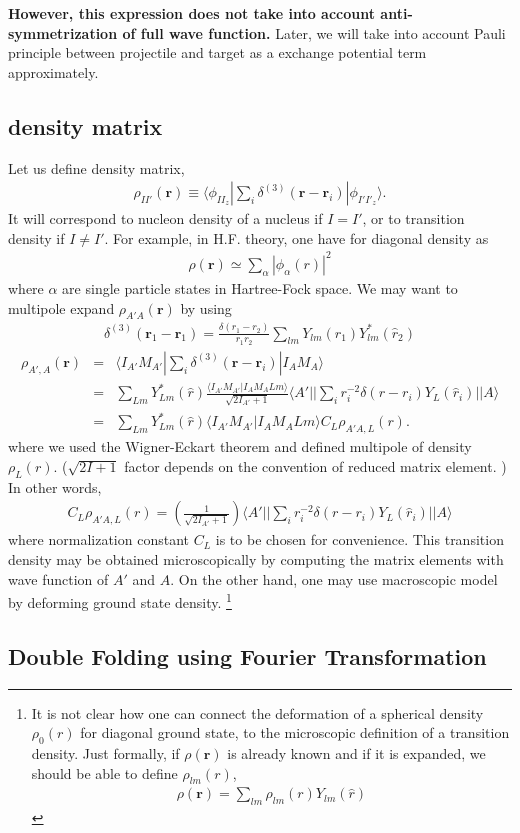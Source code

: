 \documentclass[11pt]{book}
\def\bm{\boldsymbol}
\def\vr{{\bm r}}
\def\la{\langle}
\def\ra{\rangle}
\newcommand{\bea}{\begin{eqnarray}}
\newcommand{\eea}{\end{eqnarray}}
\newcommand{\no}{\nonumber \\}
\begin{document}
{\bf However, this expression does not take into account anti-symmetrization of full wave function.}
Later, we will take into account Pauli principle between projectile and target 
as a exchange potential term approximately. 

\subsection{density matrix} 
Let us define density matrix, 
\bea 
\rho_{I I'}(\vr) \equiv \la \phi_{I I_z}|\sum_{i}  \delta^{(3)}(\vr-\vr_i) |\phi_{I' I'_z}\ra.
\eea 
It will correspond to nucleon density of a nucleus if $I=I'$, or  
to transition density if $I\neq I'$.
For example, in H.F. theory, one have for diagonal density as
\bea
\rho(\vr)\simeq \sum_\alpha |\phi_\alpha(r)|^2 
\eea 
where $\alpha$ are single particle states in Hartree-Fock space.
We may want to multipole expand $\rho_{A'A}(\vr)$ by using  
\bea 
\delta^{(3)}(\vr_1-\vr_1)=\frac{\delta(r_1-r_2)}{r_1r_2}\sum_{lm} Y_{lm}(\hat{r}_1)Y^*_{lm}(\hat{r}_2)
\eea 
\bea 
\rho_{A',A}(\vr) &=& \la I_{A'} M_{A'}| \sum_i \delta^{(3)}(\vr-\vr_i)| I_A M_A\ra \no 
    &=& \sum_{L m}  Y^*_{Lm}(\hat{r})\frac{\la I_{A'} M_{A'}|I_A M_A L m\ra}{\sqrt{2 I_{A'}+1} }
      \la A' || \sum_i r_i^{-2}\delta(r-r_i) Y_L(\hat{r}_i)|| A \ra \no 
    &=& \sum_{L m} Y^*_{Lm}(\hat{r}) \la I_{A'} M_{A'}|I_A M_A L m\ra C_L \rho_{A'A,L}(r) . 
\eea 
where we used the Wigner-Eckart theorem and defined multipole of density $\rho_L(r)$.
($\sqrt{2I+1}$ factor depends on the convention of reduced matrix element. )
In other words, 
\bea 
C_L \rho_{A'A,L}(r) = \left(\frac{1}{\sqrt{2 I_{A'}+1} }\right) 
                      \la A'|| \sum_{i} r_i^{-2}\delta(r-r_i) Y_{L}(\hat{r}_i)|| A\ra 
\eea 
where normalization constant $C_L$ is to be chosen for convenience. 
This transition density may be obtained microscopically by computing 
the matrix elements with wave function of $A'$ and $A$. 
On the other hand, one may use macroscopic model by deforming ground state density. 
\footnote{
It is not clear how one can connect the deformation of a spherical density $\rho_0(r)$
for diagonal ground state, to the microscopic definition of a transition density. 
Just formally, if $\rho(\vr)$ is already known and if it is expanded, we should be able to 
define $\rho_{lm}(r)$, 
\bea 
\rho(\vr)=\sum_{lm}  \rho_{lm}(r) Y_{lm}(\hat{r})
\eea 
} 

\subsection{Double Folding using Fourier Transformation}
\end{document}
